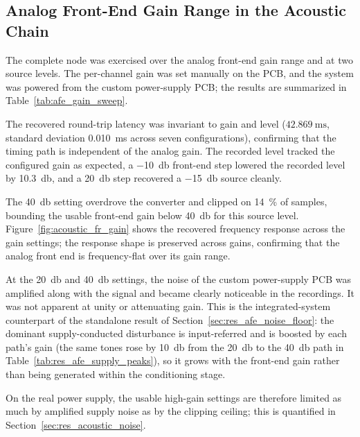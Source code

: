 \subsection{Analog Front-End Gain Range in the Acoustic Chain}

\label{sec:res_acoustic_gain}

The complete node was exercised over the analog front-end gain range and at two source levels. The per-channel gain was set manually on the PCB, and the system was powered from the custom power-supply PCB; the results are summarized in Table~\ref {tab:afe_gain_sweep}. 

The recovered round-trip latency was invariant to gain and level ($\SI{42.869}{\ms}$, standard deviation \SI{0.010}{\ms} across seven configurations), confirming that the timing path is independent of the analog gain. The recorded level tracked the configured gain as expected, a \SI{-10}{\decibel} front-end step lowered the recorded level by \SI{10.3}{\decibel}, and a \SI{+20}{\decibel} step recovered a \SI{-15}{\decibel} source cleanly. 

The \SI{+40}{\decibel} setting overdrove the converter and clipped on \SI{14}{\percent} of samples, bounding the usable front-end gain below \SI{+40}{\decibel} for this source level. Figure~\ref{fig:acoustic_fr_gain} shows the recovered frequency response across the gain settings; the response shape is preserved across gains, confirming that the analog front end is frequency-flat over its gain range.

At the \SI{+20}{\decibel} and \SI{+40}{\decibel} settings, the noise of the custom power-supply PCB was amplified along with the signal and became clearly noticeable in the recordings. It was not apparent at unity or attenuating gain. This is the integrated-system counterpart of the standalone result of Section~\ref{sec:res_afe_noise_floor}: the dominant supply-conducted disturbance is input-referred and is boosted by each path's gain (the same tones rose by \SI{10}{\decibel} from the \SI{20}{\decibel} to the \SI{40}{\decibel} path in Table~\ref{tab:res_afe_supply_peaks}), so it grows with the front-end gain rather than being generated within the conditioning stage. 

On the real power supply, the usable high-gain settings are therefore limited as much by amplified supply noise as by the clipping ceiling; this is quantified in Section~\ref{sec:res_acoustic_noise}.

